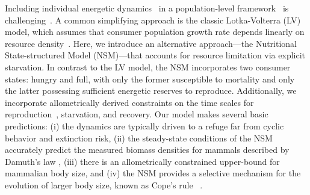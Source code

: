 \documentclass[twocolumn,preprintnumbers,amsmath,amssymb,superscriptaddress]{revtex4}
\begin{document}
Including individual energetic dynamics~\citep{Kooi2000} in a
population-level framework~\citep{Kooi2000,Sousa:2010ez} is
challenging~\citep{Diekmann:2010da}.  A common simplifying approach is the
classic Lotka-Volterra (LV) model, which assumes that consumer population
growth rate depends linearly on resource density~\citep{murdoch:2003}. Here,
we introduce an alternative approach---the Nutritional State-structured Model
(NSM)---that accounts for resource limitation via explicit starvation. In
contrast to the LV model, the NSM incorporates two consumer states: hungry
and full, with only the former susceptible to mortality and only the latter
possessing sufficient energetic reserves to reproduce.  Additionally, we
incorporate allometrically derived constraints on the time scales for
reproduction~\citep{Kempes:2012hy}, starvation, and recovery.  Our model
makes several basic predictions: (i) the dynamics are typically driven to a
refuge far from cyclic behavior and extinction risk, (ii) the steady-state
conditions of the NSM accurately predict the measured biomass densities for
mammals described by Damuth's law \citep{Damuth:1987kr,allen2002,enquist1998,pedersen2017shallow},
  (iii) there is an allometrically constrained upper-bound for mammalian body size, and
  (iv) the NSM provides a selective mechanism for the evolution of larger body size, known as Cope's rule ~\citep{Alroy:1998p1594,Clauset:2009fh,Smith:2010p3442,Saarinen:2014br}.


\end{document}

